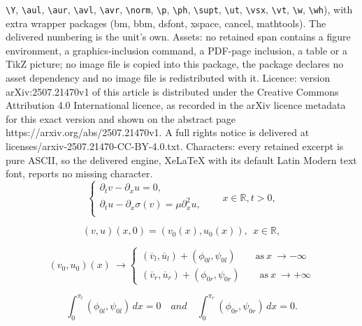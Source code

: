 \documentclass[10pt,a4paper]{amsart}
\def\R{\mathbb{R}}
\def\p{\partial}
\begin{document}
\texttt{\textbackslash Y}, \texttt{\textbackslash aul}, \texttt{\textbackslash aur}, \texttt{\textbackslash avl}, \texttt{\textbackslash avr}, \texttt{\textbackslash norm}, \texttt{\textbackslash p}, \texttt{\textbackslash ph}, \texttt{\textbackslash supt}, \texttt{\textbackslash ut}, \texttt{\textbackslash vsx}, \texttt{\textbackslash vt}, \texttt{\textbackslash w}, \texttt{\textbackslash wh}), with extra wrapper packages (bm, bbm, dsfont, xspace, cancel, mathtools). The delivered numbering is the unit's own. Assets: no retained span contains a figure environment, a graphics-inclusion command, a PDF-page inclusion, a table or a TikZ picture; no image file is copied into this package, the package declares no asset dependency and no image file is redistributed with it. Licence: version arXiv:2507.21470v1 of this article is distributed under the Creative Commons Attribution 4.0 International licence, as recorded in the arXiv licence metadata for this exact version and shown on the abstract page https://arxiv.org/abs/2507.21470v1. A full rights notice is delivered at licenses/arxiv-2507.21470-CC-BY-4.0.txt. Characters: every retained excerpt is pure ASCII, so the delivered engine, XeLaTeX with its default Latin Modern text font, reports no missing character.
\begin{equation}\label{VNC-Ion}
	\begin{cases}
		\p_tv-\p_xu=0,&\quad\\
		\p_tu-\p_x{\sigma(v)}=\mu\p^2_xu,&\quad\\
	\end{cases}x\in \R, t>0,
\end{equation}

\begin{equation}\label{initial}
	(v,u)(x,0)=(v_0(x),u_0(x)),~~x\in\R,
\end{equation} 

\begin{equation}\label{cond-farfield}
	(v_0,u_0)(x)~\to 
	\begin{cases}
		(\overline{v}_l,\overline{u}_l)+(\phi_{0l},\psi_{0l}) \qquad \text{as}~x~\rightarrow -\infty\\
		(\overline{v}_r,\overline{u}_r)+(\phi_{0r},\psi_{0r}) \qquad \text{as}~x~\rightarrow +\infty
	\end{cases}
\end{equation}	

\begin{equation}\label{0-A}
	\int_{0}^{\pi_l}(\phi_{0l},\psi_{0l})\,dx=0 \quad and \quad \int_{0}^{\pi_r}(\phi_{0r},\psi_{0r})\,dx=0.
\end{equation}
\end{document}
